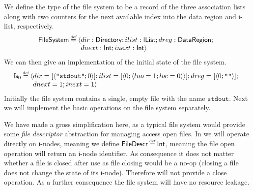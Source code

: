 \documentclass[12pt,phd,lfcs,twoside,openright,logo,leftchapter,normalheadings]{infthesis}
\theoremstyle{plain}
\theoremstyle{definition}
\begin{document}
We define the type of the file system to be a record of the three
association lists along with two counters for the next available index
into the data region and i-list, respectively.
%
\[
  \FileSystem \defas \Record{
    \ba[t]{@{}l}
      dir:\Directory;ilist:\IList;dreg:\DataRegion;\\
      dnext:\Int;inext:\Int}
    \ea
\]
%
We can then give an implementation of the initial state of the file
system.
%
\[
  \dec{fs}_0 \defas \Record{
    \ba[t]{@{}l}
      dir=[\Record{\strlit{stdout};0}];ilist=[\Record{0;\Record{lno=1;loc=0}}];dreg=[\Record{0;\strlit{}}];\\
      dnext=1;inext=1}
    \ea
\]
%
Initially the file system contains a single, empty file with the name
$\texttt{stdout}$. Next we will implement the basic operations on the
file system separately.

We have made a gross simplification here, as a typical file system
would provide some \emph{file descriptor} abstraction for managing
access open files. In \fsname{} we will operate directly on i-nodes,
meaning we define $\UFD \defas \Int$, meaning the file open operation
will return an i-node identifier. As consequence it does not matter
whether a file is closed after use as file closing would be a no-op
(closing a file does not change the state of its i-node). Therefore
\fsname{} will not provide a close operation. As a further consequence
the file system will have no resource leakage.
\end{document}
